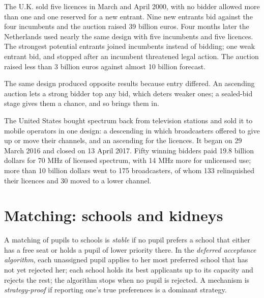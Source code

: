 \begin{record}
The U.K. sold five licences in March and April 2000, with no bidder allowed more than
one and one reserved for a new entrant. Nine new entrants bid against the four
incumbents and the auction raised 39 billion euros. Four months later the
Netherlands used nearly the same design with five incumbents and five licences. The
strongest potential entrants joined incumbents instead of bidding; one weak entrant
bid, and stopped after an incumbent threatened legal action. The auction raised less
than 3 billion euros against almost 10 billion forecast. %
\end{record}

The same design produced opposite results because entry differed. An ascending
auction lets a strong bidder top any bid, which deters weaker ones; a sealed-bid stage
gives them a chance, and so brings them in.

\begin{record}
The United States bought spectrum back from television stations and sold it to
mobile operators in one design: a descending  in which broadcasters
offered to give up or move their channels, and an ascending  for the
licences. It began on 29 March 2016 and closed on 13 April 2017. Fifty winning bidders paid
19.8 billion dollars for 70 MHz of licensed spectrum, with 14 MHz more for unlicensed use; more than 10
billion dollars went to 175 broadcasters, of whom 133 relinquished their licences and 30 moved to a
lower channel. %
\end{record}

\section{Matching: schools and kidneys}\label{sec:b3:auctions-and-market-design:matching}

\begin{definition}\label{def:b3:auctions-and-market-design:matching}
A matching of pupils to schools is \emph{stable} if no pupil prefers a school that
either has a free seat or holds a pupil of lower priority there. In the \emph{deferred
acceptance algorithm}, each unassigned pupil applies to her most preferred school
that has not yet rejected her; each school holds its best applicants up to its
capacity and rejects the rest; the algorithm stops when no pupil is rejected. A
mechanism is \emph{strategy-proof} if reporting one's true preferences is a dominant
strategy.
\end{definition}

